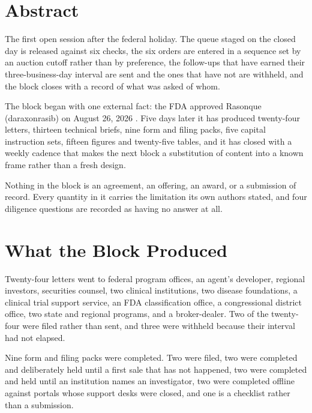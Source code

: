 \section*{Abstract}

The first open session after the federal holiday. The queue staged on the closed
day is released against six checks, the six orders are entered in a sequence set
by an auction cutoff rather than by preference, the follow-ups that have earned
their three-business-day interval are sent and the ones that have not are
withheld, and the block closes with a record of what was asked of whom.

The block began with one external fact: the FDA approved Rasonque (daraxonrasib)
on August 26, 2026 \cite{fdarasonque2026}. Five days later it has produced
twenty-four letters, thirteen technical briefs, nine form and filing packs, five
capital instruction sets, fifteen figures and twenty-five tables, and it has
closed with a weekly cadence that makes the next block a substitution of content
into a known frame rather than a fresh design.

Nothing in the block is an agreement, an offering, an award, or a submission of
record. Every quantity in it carries the limitation its own authors stated, and
four diligence questions are recorded as having no answer at all.

\section{What the Block Produced}

Twenty-four letters went to federal program offices, an agent's developer,
regional investors, securities counsel, two clinical institutions, two disease
foundations, a clinical trial support service, an FDA classification office, a
congressional district office, two state and regional programs, and a
broker-dealer. Two of the twenty-four were filed rather than sent, and three were
withheld because their interval had not elapsed.

Nine form and filing packs were completed. Two were filed, two were completed and
deliberately held until a first sale that has not happened, two were completed and
held until an institution names an investigator, two were completed offline
against portals whose support desks were closed, and one is a checklist rather
than a submission.

